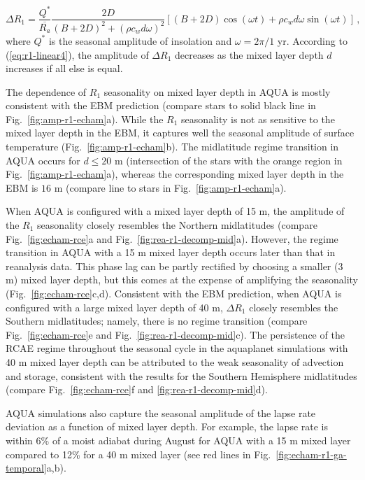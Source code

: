 \documentclass{ametsocV5}
\begin{document}
  \begin{equation} \label{eq:r1-linear4}
    \Delta R_{1} = \frac{Q^{*}}{\overline{R_{a}}}\frac{2D}{(B+2D)^{2}+(\rho c_w d \omega)^{2}}\left[(B+2D)\cos(\omega t)+\rho c_w d \omega \sin(\omega t)\right] \, ,
  \end{equation}
  where $Q^*$ is the seasonal amplitude of insolation and $\omega=2\pi/1$ yr. According to (\ref{eq:r1-linear4}), the amplitude of $\Delta R_1$ decreases as the mixed layer depth $d$ increases if all else is equal. 

  The dependence of $R_1$ seasonality on mixed layer depth in AQUA is mostly consistent with the EBM prediction (compare stars to solid black line in Fig.~\ref{fig:amp-r1-echam}a). While the $R_1$ seasonality is not as sensitive to the mixed layer depth in the EBM, it captures well the seasonal amplitude of surface temperature (Fig.~\ref{fig:amp-r1-echam}b). The midlatitude regime transition in AQUA occurs for $d \le 20$ m (intersection of the stars with the orange region in Fig.~\ref{fig:amp-r1-echam}a), whereas the corresponding mixed layer depth in the EBM is $16$ m (compare line to stars in Fig.~\ref{fig:amp-r1-echam}a).

  When AQUA is configured with a mixed layer depth of 15 m, the amplitude of the \(R_{1}\) seasonality closely resembles the Northern midlatitudes (compare Fig.~\ref{fig:echam-rce}a and Fig.~\ref{fig:rea-r1-decomp-mid}a). However, the regime transition in AQUA with a 15 m mixed layer depth occurs later than that in reanalysis data. This phase lag can be partly rectified by choosing a smaller (3 m) mixed layer depth, but this comes at the expense of amplifying the seasonality (Fig.~\ref{fig:echam-rce}c,d). Consistent with the EBM prediction, when AQUA is configured with a large mixed layer depth of 40 m, \(\Delta R_{1}\) closely resembles the Southern midlatitudes; namely, there is no regime transition (compare Fig.~\ref{fig:echam-rce}e and Fig.~\ref{fig:rea-r1-decomp-mid}c). The persistence of the RCAE regime throughout the seasonal cycle in the aquaplanet simulations with 40 m mixed layer depth can be attributed to the weak seasonality of advection and storage, consistent with the results for the Southern Hemisphere midlatitudes (compare Fig.~\ref{fig:echam-rce}f and \ref{fig:rea-r1-decomp-mid}d).

  AQUA simulations also capture the seasonal amplitude of the lapse rate deviation as a function of mixed layer depth. For example, the lapse rate is within 6\% of a moist adiabat during August for AQUA with a 15 m mixed layer compared to 12\% for a 40 m mixed layer (see red lines in Fig.~\ref{fig:echam-r1-ga-temporal}a,b).
\end{document}
